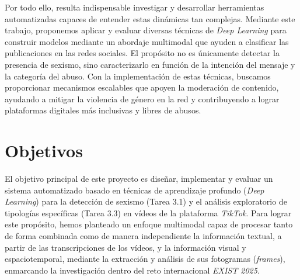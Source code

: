 Por todo ello, resulta indispensable investigar y desarrollar herramientas automatizadas capaces de entender estas dinámicas tan complejas. Mediante este trabajo, proponemos aplicar y evaluar diversas técnicas de \textit{Deep Learning} para construir modelos mediante un abordaje multimodal que ayuden a clasificar las publicaciones en las redes sociales. El propósito no es únicamente detectar la presencia de sexismo, sino caracterizarlo en función de la intención del mensaje y la categoría del abuso. Con la implementación de estas técnicas, buscamos proporcionar mecanismos escalables que apoyen la moderación de contenido, ayudando a mitigar la violencia de género en la red y contribuyendo a lograr plataformas digitales más inclusivas y libres de abusos. 

\section{Objetivos}
\label{sec:Objetivos}
El objetivo principal de este proyecto es diseñar, implementar y evaluar un sistema automatizado basado en técnicas de aprendizaje profundo (\textit{Deep Learning}) para la detección de sexismo (Tarea 3.1) y el análisis exploratorio de tipologías específicas (Tarea 3.3) en vídeos de la plataforma \textit{TikTok}. Para lograr este propósito, hemos planteado un enfoque multimodal capaz de procesar tanto de forma combinada como de manera independiente la información textual, a partir de las transcripciones de los vídeos, y la información visual y espaciotemporal, mediante la extracción y análisis de sus fotogramas (\textit{frames}), enmarcando la investigación dentro del reto internacional \textit{EXIST 2025}.

